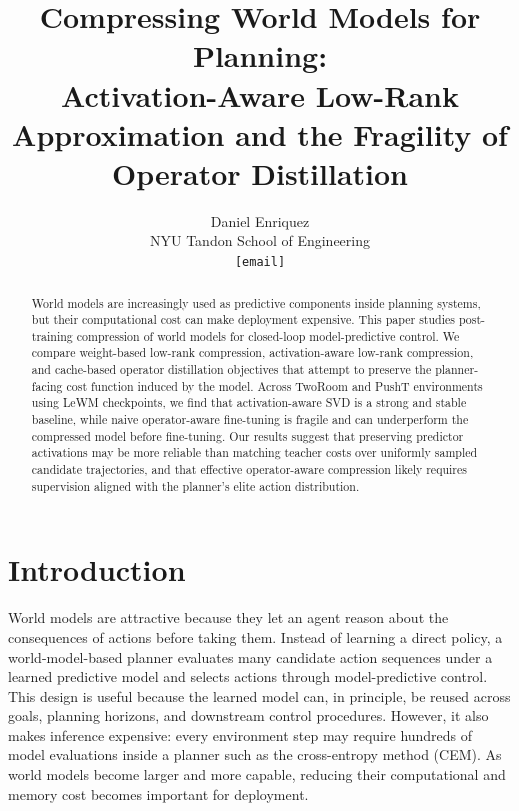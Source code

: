 \documentclass[11pt]{article}
\title{
    Compressing World Models for Planning:\\
    Activation-Aware Low-Rank Approximation and the Fragility of Operator Distillation
}
\author{
    Daniel Enriquez \\
    NYU Tandon School of Engineering \\
    \texttt{[email]}
}
\date{}
\begin{document}
\maketitle

\begin{abstract}
World models are increasingly used as predictive components inside planning systems, but their computational cost can make deployment expensive. 
This paper studies post-training compression of world models for closed-loop model-predictive control. 
We compare weight-based low-rank compression, activation-aware low-rank compression, and cache-based operator distillation objectives that attempt to preserve the planner-facing cost function induced by the model.
Across TwoRoom and PushT environments using LeWM checkpoints, we find that activation-aware SVD is a strong and stable baseline, while naive operator-aware fine-tuning is fragile and can underperform the compressed model before fine-tuning.
Our results suggest that preserving predictor activations may be more reliable than matching teacher costs over uniformly sampled candidate trajectories, and that effective operator-aware compression likely requires supervision aligned with the planner's elite action distribution.
\end{abstract}

\section{Introduction}

World models are attractive because they let an agent reason about the consequences of actions before taking them. Instead of learning a direct policy, a world-model-based planner evaluates many candidate action sequences under a learned predictive model and selects actions through model-predictive control. This design is useful because the learned model can, in principle, be reused across goals, planning horizons, and downstream control procedures. However, it also makes inference expensive: every environment step may require hundreds of model evaluations inside a planner such as the cross-entropy method (CEM). As world models become larger and more capable, reducing their computational and memory cost becomes important for deployment.
\end{document}
